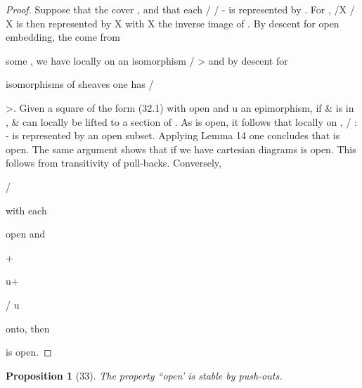 \documentclass[11pt,a4paper]{article}
\theoremstyle{plain}
\newtheorem{proposition}[theorem]{Proposition}
\theoremstyle{definition}
\begin{document}
\begin{proof} Suppose that the  cover  , and that each / /  - is represented
by    . For 
 , /X /  X is then represented by X   with
X the inverse image of  . By descent for open embedding,
the  come from

some    , we have locally on  an isomorphism /
> and by descent for

isomorphisms of sheaves one has /

>.
Given a square of the form (32.1) with   open and u an epimorphism, if \& is in
, \& can locally be lifted to a section of  . As   is open, it follows that locally
on  , / : - is represented by an open subset. Applying Lemma 14 one concludes
that  is open. The same argument shows that if we have cartesian diagrams
 is open. This follows from transitivity of pull-backs. Conversely,







/ 




with each

 open and

+








u+

/ 
u



onto, then



 is open.

\end{proof}

\begin{proposition}[33]
The property ``open' is stable by push-outs.
\end{proposition}
\end{document}
